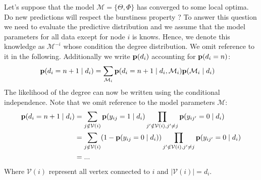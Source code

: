 \documentclass[a4paper, 12pt]{article}
\begin{document}
Let's suppose that the model $\mathcal{M} = \{\Theta, \Phi\}$ has converged to some local optima. Do new predictions will respect the burstiness property ? To answer this question we need to evaluate the predictive distribution and we assume that the model parameters for all data except for node $i$ is knows. Hence, we denote this knowledge as $\mathcal{M}^{-i}$ whose condition the degree distribution. We omit reference to it in the following. Additionally we write $\mathbf{p}(d_i)$ accounting for $\mathbf{p}(d_i=n)$:
\begin{align}
    \mathbf{p}(d_i=n+1 \mid d_i) &= \sum_{\mathcal{M}_i} \mathbf{p}(d_i=n+1 \mid d_i, \mathcal{M}_i) \mathbf{p}(\mathcal{M}_i \mid d_i)
\end{align}
The likelihood of the degree can now be written using the conditional independence. Note that we omit reference to the model parameters $\mathcal{M}$:
\begin{align}
    \mathbf{p}(d_i=n+1 \mid d_i) &= \sum_{j \notin \mathcal{V}(i)} \mathbf{p}(y_{ij} = 1 \mid d_i) \prod_{j'\notin \mathcal{V}(i), j' \neq j} \mathbf{p}(y_{ij'}=0 \mid d_i) \\
    &=  \sum_{j \notin \mathcal{V}(i)} (1 - \mathbf{p}(y_{ij} = 0 \mid d_i) ) \prod_{j'\notin \mathcal{V}(i), j' \neq j} \mathbf{p}(y_{ij'}=0 \mid d_i) \\
    &= ...
\end{align}
Where $\mathcal{V}(i)$ represent all vertex connected to $i$ and $| \mathcal{V}(i) | = d_i$.\\





\end{document}
